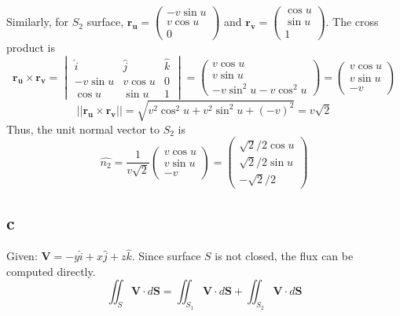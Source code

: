 \documentclass{article}
\begin{document}
Similarly, for $S_2$ surface, $\mathbf{r_u} = \begin{pmatrix} -v\sin u \\ v\cos u \\ 0 \end{pmatrix}$ and $\mathbf{r_v} = \begin{pmatrix} \cos u \\ \sin u \\ 1 \end{pmatrix}$. The cross product is
\begin{equation*}
  \mathbf{r_u} \times \mathbf{r_v} = 
  \begin{vmatrix}
    \hat{i} & \hat{j} & \hat{k} \\
    -v\sin u & v\cos u & 0 \\
    \cos u & \sin u & 1
  \end{vmatrix} =
  \begin{pmatrix}
    v\cos u \\ v\sin u \\ -v \sin^2 u - v\cos^2 u
  \end{pmatrix} =
  \begin{pmatrix}
    v\cos u \\ v\sin u \\ -v
  \end{pmatrix}
\end{equation*}
\begin{equation*}
  ||\mathbf{r_u} \times \mathbf{r_v}|| = \sqrt{v^2\cos^2 u + v^2\sin^2 u + (-v)^2} = v\sqrt{2}
\end{equation*}
Thus, the unit normal vector to $S_2$ is
\begin{equation*}
  \hat{n_2} = \frac{1}{v\sqrt{2}} \begin{pmatrix}
    v\cos u \\ v\sin u \\ -v
  \end{pmatrix} = \begin{pmatrix}
    \sqrt{2}/2\cos u \\ \sqrt{2}/2\sin u \\ -\sqrt{2}/2
  \end{pmatrix}
\end{equation*}

\subsection{c}
Given: $\mathbf{V} = -y\hat{i} + x\hat{j} + z\hat{k}$. Since surface $S$ is not closed, the flux can be computed directly.
\begin{equation*}
  \iint_{S} \mathbf{V} \cdot d\mathbf{S} = \iint_{S_1} \mathbf{V} \cdot d\mathbf{S} + \iint_{S_2} \mathbf{V} \cdot d\mathbf{S}
\end{equation*}
\end{document}
